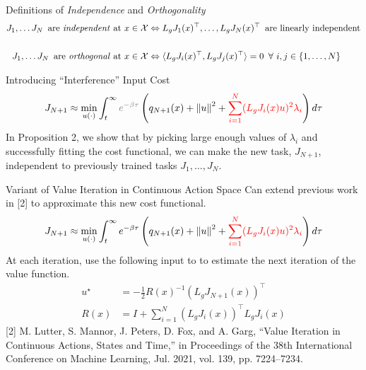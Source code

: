 \begin{frame}{Definitions of \textit{Independence} and \textit{Orthogonality}}
	\centering
	\begin{align*}
		{J}_1, \ldots {J}_N \,\,\, \textrm{are \textit{independent} at $x \in \mathcal{X}$} &\Leftrightarrow L_g {J}_1 (x)^{\top}, \ldots, L_g {J}_N (x)^{\top} \,\,\, \textrm{are linearly independent}\\
		\\
		{J}_1, \ldots {J}_N \,\,\, \textrm{are \textit{orthogonal} at $x \in \mathcal{X}$} &\Leftrightarrow \langle L_g {J}_i (x)^{\top}, L_g {J}_j (x)^{\top} \rangle = 0 \,\,\, \forall \,\, i, j \in \{1,\ldots,N \}
	\end{align*}
\end{frame}

\begin{frame}{Introducing ``Interference'' Input Cost}
	\begin{align*}
		{J}_{N + 1} \approx \min_{u(\cdot)} \int_t^{\infty} { \color{gray}  e^{- \beta \tau } } \left( q_{N + 1}(x) + { \lVert u \rVert }^2 + { \color{red} \sum_{i = 1}^N ( L_g {J}_i (x) u)^2 \lambda_i } \right) d \tau
        \end{align*}
	\seprule
	In Proposition 2, we show that by picking large enough values of $\lambda_i$ and successfully fitting the cost functional, we can make the new task, $J_{N + 1}$, independent to previously trained tasks $J_1, \ldots, J_N$. 
\end{frame}

\begin{frame}{Variant of Value Iteration in Continuous Action Space}
	Can extend previous work in [2] to approximate this new cost functional.
	\begin{align*}
                {J}_{N + 1} \approx \min_{u(\cdot)} \int_t^{\infty} e^{- \beta \tau } \left( q_{N + 1}(x) + { \lVert u \rVert }^2 + { \color{red} \sum_{i = 1}^N ( L_g {J}_i (x) u)^2 \lambda_i } \right) d \tau
	\end{align*}
	At each iteration, use the following input to to estimate the next iteration of the value function.
	\begin{align*}
                u^{\star} &= - \frac{1}{2} {R(x)}^{-1} ( L_g {J}_{N + 1} (x) )^{\top} \\ 
                R(x) &= I + \sum_{i = 1}^N ( L_g {J}_i (x) )^{\top} L_g {J}_i (x)
	\end{align*}
	\seprule
	\footnotesize{[2] M. Lutter, S. Mannor, J. Peters, D. Fox, and A. Garg, “Value Iteration in Continuous Actions, States and Time,” in Proceedings of the 38th International Conference on Machine Learning, Jul. 2021, vol. 139, pp. 7224–7234.}
\end{frame}


